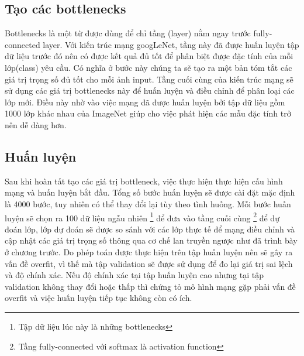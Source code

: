 	\subsection{Tạo các bottlenecks}
	
	Bottlenecks\cite{bottlenecks} là một từ được dùng để chỉ tầng (layer) nằm ngay trước fully-connected layer. Với kiến trúc mạng googLeNet, tầng này đã được huấn luyện tập dữ liệu trước đó nên có được kết quả đủ tốt để phân biệt được đặc tính của mỗi lớp(class) yêu cầu. Có nghĩa ở bước này chúng ta sẽ tạo ra một bản tóm tắt các giá trị trọng số đủ tốt cho mỗi ảnh input. Tầng cuối cùng của kiến trúc mạng sẽ sử dụng các giá trị bottlenecks này để huấn luyện và điều chỉnh để phân loại các lớp mới. Điều này nhờ vào việc mạng đã được huấn luyện bởi tập dữ liệu gồm 1000 lớp khác nhau của ImageNet giúp cho việc phát hiện các mẫu đặc tính trở nên dễ dàng hơn.
	
	\subsection{Huấn luyện}
	
	Sau khi hoàn tất tạo các giá trị bottleneck, việc thực hiện thực hiện cấu hình mạng và huấn luyện bắt đầu. Tổng số bước huấn luyện sẽ được cài đặt mặc định là 4000 bước, tuy nhiên có thể thay đổi lại tùy theo tình huống. Mỗi bước huấn luyện sẽ chọn ra 100 dữ liệu ngẫu nhiên \footnote{Tập dữ liệu lúc này là những bottlenecks} để đưa vào tầng cuối cùng \footnote{Tầng fully-connected với softmax là activation function} để dự đoán lớp, lớp dự đoán sẽ được so sánh với các lớp thực tế để mạng điều chỉnh và cập nhật các giá trị trọng số thông qua cơ chế lan truyền ngược như đã trình bày ở chương trước. Do phép toán được thực hiện trên tập huấn luyện nên sẽ  gây ra vấn đề overfit, vì thế mà tập validation sẽ được sử dụng để đo lại giá trị sai lệch và độ chính xác. Nếu độ chính xác tại tập huấn luyện cao nhưng tại tập validation không thay đổi hoặc thấp thì chứng tỏ mô hình mạng gặp phải vấn đề overfit và việc huấn luyện tiếp tục không còn có ích.
	


